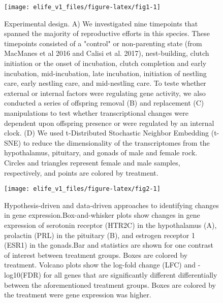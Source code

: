 \begin{Schunk}
\begin{figure}
\texttt{[image: elife\_v1\_files/figure-latex/fig1-1]} \caption[Experimental design]{Experimental design. A) We investigated nine timepoints that spanned the majority of reproductive efforts in this species. These timepoints consisted of a "control" or non-parenting state (from MacManes et al 2016 and Calisi et al. 2017), nest-building, clutch initiation or the onset of incubation, clutch completion and early incubation, mid-incubation, late incubation, initiation of nestling care, early nestling care, and mid-nestling care. To teste whether external or internal factors were regulating gene activity, we also conducted a series of offspring removal (B) and replacement (C) manipulations to test whether transcriptional changes were dependent upon offspring presence or were regulated by an internal clock. (D) We used t-Distributed Stochastic Neighbor Embedding (t-SNE) to reduce the dimensionality of the transcriptomes from the hypothalamus, pituitary, and gonads of male and female rock. Circles and triangles represent female and male samples, respectively, and points are colored by treatment.}\label{fig:fig1}
\end{figure}
\end{Schunk}

\begin{Schunk}
\begin{figure}
\texttt{[image: elife\_v1\_files/figure-latex/fig2-1]} \caption[Hypothesis-driven and data-driven approaches to identifying changes in gene expression.Box-and-whisker plots show changes in gene expression of serotonin receptor (HTR2C) in the hypothalamus (A), prolactin (PRL) in the pituitary (B), and estrogen receptor 1 (ESR1) in the gonads.Bar and statistics are shown for one contrast of interest between treatment groups]{Hypothesis-driven and data-driven approaches to identifying changes in gene expression.Box-and-whisker plots show changes in gene expression of serotonin receptor (HTR2C) in the hypothalamus (A), prolactin (PRL) in the pituitary (B), and estrogen receptor 1 (ESR1) in the gonads.Bar and statistics are shown for one contrast of interest between treatment groups. Boxes are colored by treatment. Volcano plots show the log-fold change (LFC) and -log10(FDR) for all genes that are significantly different differentially between the aforementioned treatment groups. Boxes are colored by the treatment were gene expression was higher.}\label{fig:fig2}
\end{figure}
\end{Schunk}


